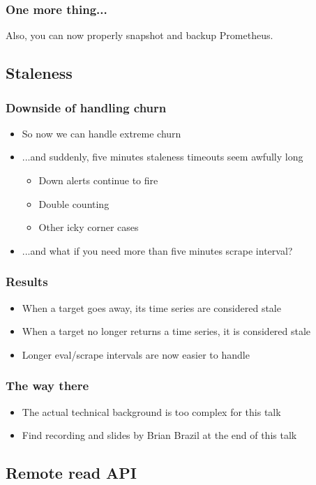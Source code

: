\documentclass[t]{beamer}
\begin{document}
\begin{frame}
	\frametitle{One more thing...}
	\vfill
	Also, you can now properly snapshot and backup Prometheus.
	\vfill
\end{frame}


\subsection{Staleness}


\begin{frame}
	\frametitle{Downside of handling churn}
	\begin{itemize}
		\item So now we can handle extreme churn
		\item ...and suddenly, five minutes staleness timeouts seem awfully long
		\begin{itemize}
			\item Down alerts continue to fire
			\item Double counting
			\item Other icky corner cases
		\end{itemize}
		\item ...and what if you need more than five minutes scrape interval?
	\end{itemize}
\end{frame}

\begin{frame}
	\frametitle{Results}
	\begin{itemize}
		\item When a target goes away, its time series are considered stale
		\item When a target no longer returns a time series, it is considered stale
		\item Longer eval/scrape intervals are now easier to handle
	\end{itemize}
\end{frame}

\begin{frame}
	\frametitle{The way there}
	\begin{itemize}
		\item The actual technical background is too complex for this talk
		\item Find recording and slides by Brian Brazil at the end of this talk
	\end{itemize}
\end{frame}


\subsection{Remote read API}
\end{document}
